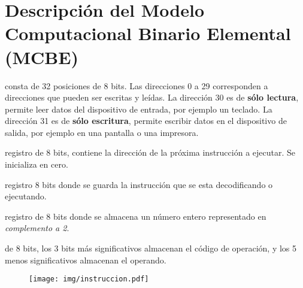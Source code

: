 \documentclass[12pt]{article}
\begin{document}
\appendix
\clearpage
\addappheadtotoc
\appendixpage

\section*{Descripción del Modelo Computacional Binario Elemental (MCBE)}

\begin{description}
    \itemsep2pt \parskip0pt 

    \item[Memoria:] consta de 32 posiciones de 8 bits. Las direcciones 0 a 29
        corresponden a direcciones que pueden ser escritas y leídas. La
        dirección 30 es de \textbf{sólo lectura}, permite leer datos del
        dispositivo de entrada, por ejemplo un teclado. La dirección 31 es de
        \textbf{sólo escritura}, permite escribir datos en el dispositivo de
        salida, por ejemplo en una pantalla o una impresora.

    \item[Registro PC:] registro de 8 bits, contiene la dirección de la
        próxima instrucción a ejecutar. Se inicializa en cero.

    \item[Registro IR:] registro 8 bits donde se guarda la instrucción que se
        esta decodificando o ejecutando.

    \item[Registro acumulador:] registro de 8 bits donde se almacena un
        número entero representado en \emph{complemento a 2}.

    \item[Instrucciones:] de 8 bits, los 3 bits más significativos almacenan
        el código de operación, y los 5 menos significativos almacenan el
        operando.
    
        \begin{figure}[h]
            \centering
            \texttt{[image: img/instruccion.pdf]}
        \end{figure}

\end{description}
\end{document}
